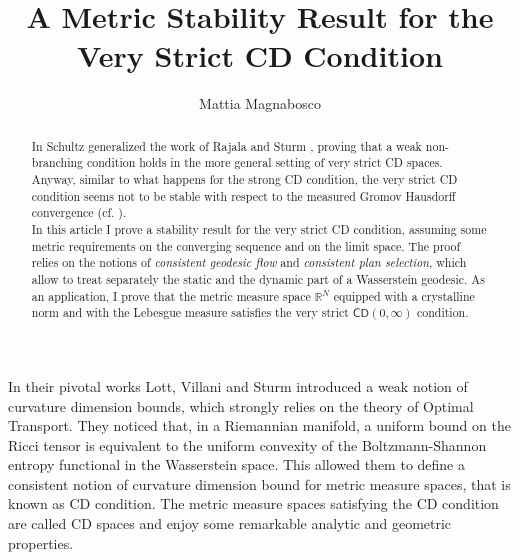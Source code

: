 \documentclass[11pt,twoside,a4paper]{article}
\author{Mattia Magnabosco}
\title{\textbf{A Metric Stability Result for the Very Strict CD Condition}}
\date{}
\newcommand{\R}{\mathbb{R}}
\newcommand{\CD}{\mathsf{CD}}
\theoremstyle{theorem}
\theoremstyle{definition}
\theoremstyle{remark}
\theoremstyle{proof}
\begin{document}
\maketitle

\begin{abstract}
    In \cite{schultz2017existence} Schultz generalized the work of Rajala and Sturm \cite{rajalasturm}, proving that a weak non-branching condition holds in the more general setting of very strict CD spaces. Anyway, similar to what happens for the strong CD condition, the very strict CD condition seems not to be stable with respect to the measured Gromov Hausdorff convergence (cf. \cite{MM-Example}).\\
    In this article I prove a stability result for the very strict CD condition, assuming some metric requirements on the converging sequence and on the limit space. The proof relies on the notions of \textit{consistent geodesic flow} and \textit{consistent plan selection}, which allow to treat separately the static and the dynamic part of a Wasserstein geodesic. As an application, I prove that the metric measure space $\R^N$ equipped with a crystalline norm and with the Lebesgue measure satisfies the very strict $\CD(0,\infty)$ condition.  
\end{abstract}


In their pivotal works Lott, Villani \cite{lottvillani} and Sturm \cite{sturm2006,sturm2006ii} introduced a weak notion of curvature dimension bounds, which strongly relies on the theory of Optimal Transport. They noticed that, in a Riemannian manifold, a uniform bound on the Ricci tensor is equivalent to the uniform convexity of the Boltzmann-Shannon entropy functional in the Wasserstein space. This allowed them to define a consistent notion of curvature dimension bound for metric measure spaces, that is known as CD condition. The metric measure spaces satisfying the CD condition are called CD spaces and enjoy some remarkable analytic and geometric properties.
\end{document}
